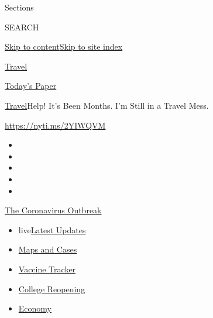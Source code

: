 Sections

SEARCH

\protect\hyperlink{site-content}{Skip to
content}\protect\hyperlink{site-index}{Skip to site index}

\href{https://www.nytimes.com/section/travel}{Travel}

\href{https://myaccount.nytimes.com/auth/login?response_type=cookie\&client_id=vi}{}

\href{https://www.nytimes.com/section/todayspaper}{Today's Paper}

\href{/section/travel}{Travel}\textbar{}Help! It's Been Months. I'm
Still in a Travel Mess.

\url{https://nyti.ms/2YIWQVM}

\begin{itemize}
\item
\item
\item
\item
\item
\end{itemize}

\href{https://www.nytimes.com/news-event/coronavirus?action=click\&pgtype=Article\&state=default\&region=TOP_BANNER\&context=storylines_menu}{The
Coronavirus Outbreak}

\begin{itemize}
\tightlist
\item
  live\href{https://www.nytimes.com/2020/08/03/world/coronavirus-covid-19.html?action=click\&pgtype=Article\&state=default\&region=TOP_BANNER\&context=storylines_menu}{Latest
  Updates}
\item
  \href{https://www.nytimes.com/interactive/2020/us/coronavirus-us-cases.html?action=click\&pgtype=Article\&state=default\&region=TOP_BANNER\&context=storylines_menu}{Maps
  and Cases}
\item
  \href{https://www.nytimes.com/interactive/2020/science/coronavirus-vaccine-tracker.html?action=click\&pgtype=Article\&state=default\&region=TOP_BANNER\&context=storylines_menu}{Vaccine
  Tracker}
\item
  \href{https://www.nytimes.com/2020/08/02/us/covid-college-reopening.html?action=click\&pgtype=Article\&state=default\&region=TOP_BANNER\&context=storylines_menu}{College
  Reopening}
\item
  \href{https://www.nytimes.com/live/2020/08/03/business/stock-market-today-coronavirus?action=click\&pgtype=Article\&state=default\&region=TOP_BANNER\&context=storylines_menu}{Economy}
\end{itemize}

